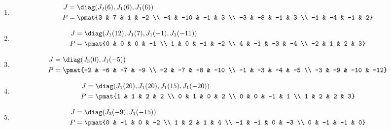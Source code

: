 \begin{enumerate}
\item

\begin{align*}
J &= \diag(J_{2}(6), J_{1}(6), J_{1}(6))\\
P &= \pmat{3 & 7 & 1 & -2 \\ -4 & -10 & -1 & 3 \\ -3 & -8 & -1 & 3 \\ -1 & -4 & -1 & 2}
\end{align*}

\item

\begin{align*}
J &= \diag(J_{1}(12), J_{1}(7), J_{1}(-1), J_{1}(-11))\\
P &= \pmat{0 & 0 & 0 & -1 \\ 1 & 0 & -1 & -2 \\ 4 & -1 & -3 & -4 \\ -2 & 1 & 2 & 3}
\end{align*}

\item

\begin{align*}
J &= \diag(J_{3}(0), J_{1}(-5))\\
P &= \pmat{-2 & -6 & -7 & -9 \\ -2 & -7 & -8 & -10 \\ -1 & -3 & -4 & -5 \\ -3 & -9 & -10 & -12}
\end{align*}

\item

\begin{align*}
J &= \diag(J_{1}(20), J_{1}(20), J_{1}(15), J_{1}(-20))\\
P &= \pmat{1 & 1 & 2 & 2 \\ 0 & 1 & 0 & 2 \\ 0 & 0 & -1 & 1 \\ 1 & 2 & 2 & 3}
\end{align*}

\item

\begin{align*}
J &= \diag(J_{3}(-9), J_{1}(-15))\\
P &= \pmat{0 & -1 & 0 & -2 \\ 1 & 2 & 1 & 4 \\ -1 & -1 & 0 & -3 \\ 0 & -1 & -1 & 0}
\end{align*}


\end{enumerate}
